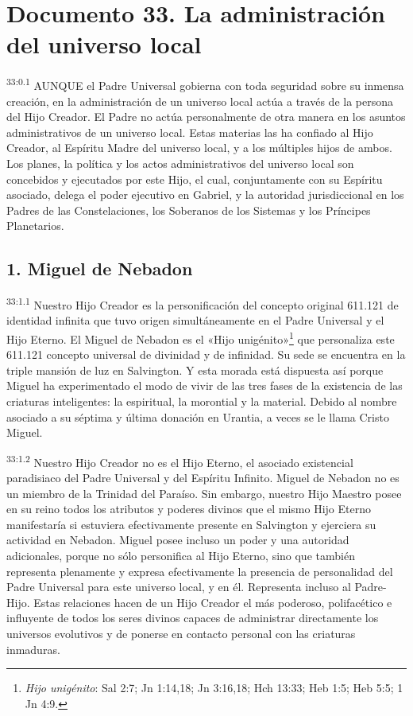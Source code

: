 \chapter{Documento 33. La administración del universo local}
\par
\textsuperscript{33:0.1} AUNQUE el Padre Universal gobierna con toda seguridad sobre su inmensa creación, en la administración de un universo local actúa a través de la persona del Hijo Creador. El Padre no actúa personalmente de otra manera en los asuntos administrativos de un universo local. Estas materias las ha confiado al Hijo Creador, al Espíritu Madre del universo local, y a los múltiples hijos de ambos. Los planes, la política y los actos administrativos del universo local son concebidos y ejecutados por este Hijo, el cual, conjuntamente con su Espíritu asociado, delega el poder ejecutivo en Gabriel, y la autoridad jurisdiccional en los Padres de las Constelaciones, los Soberanos de los Sistemas y los Príncipes Planetarios.

\section*{1. Miguel de Nebadon}
\par
\textsuperscript{33:1.1} Nuestro Hijo Creador es la personificación del concepto original 611.121 de identidad infinita que tuvo origen simultáneamente en el Padre Universal y el Hijo Eterno. El Miguel de Nebadon es el «Hijo unigénito»\footnote{\textit{Hijo unigénito}: Sal 2:7; Jn 1:14,18; Jn 3:16,18; Hch 13:33; Heb 1:5; Heb 5:5; 1 Jn 4:9.} que personaliza este 611.121{\textordmasculine} concepto universal de divinidad y de infinidad. Su sede se encuentra en la triple mansión de luz en Salvington. Y esta morada está dispuesta así porque Miguel ha experimentado el modo de vivir de las tres fases de la existencia de las criaturas inteligentes: la espiritual, la morontial y la material. Debido al nombre asociado a su séptima y última donación en Urantia, a veces se le llama Cristo Miguel.

\par
\textsuperscript{33:1.2} Nuestro Hijo Creador no es el Hijo Eterno, el asociado existencial paradisiaco del Padre Universal y del Espíritu Infinito. Miguel de Nebadon no es un miembro de la Trinidad del Paraíso. Sin embargo, nuestro Hijo Maestro posee en su reino todos los atributos y poderes divinos que el mismo Hijo Eterno manifestaría si estuviera efectivamente presente en Salvington y ejerciera su actividad en Nebadon. Miguel posee incluso un poder y una autoridad adicionales, porque no sólo personifica al Hijo Eterno, sino que también representa plenamente y expresa efectivamente la presencia de personalidad del Padre Universal para este universo local, y en él. Representa incluso al Padre-Hijo. Estas relaciones hacen de un Hijo Creador el más poderoso, polifacético e influyente de todos los seres divinos capaces de administrar directamente los universos evolutivos y de ponerse en contacto personal con las criaturas inmaduras.

